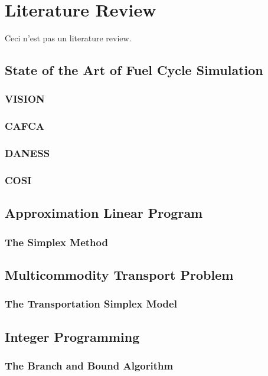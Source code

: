 \chapter{Literature Review}\label{ch:litreview}

Ceci n'est pas un literature review. 

\section{State of the Art of Fuel Cycle Simulation}\label{sec:simulators}

\subsection{VISION}
\subsection{CAFCA}
\subsection{DANESS}
\subsection{COSI}

\section{Approximation Linear Program}

\subsection{The Simplex Method}

\section{Multicommodity Transport Problem}\label{sec:MTP}

\subsection{The Transportation Simplex Model}

\section{Integer Programming}

\subsection{The Branch and Bound Algorithm}

